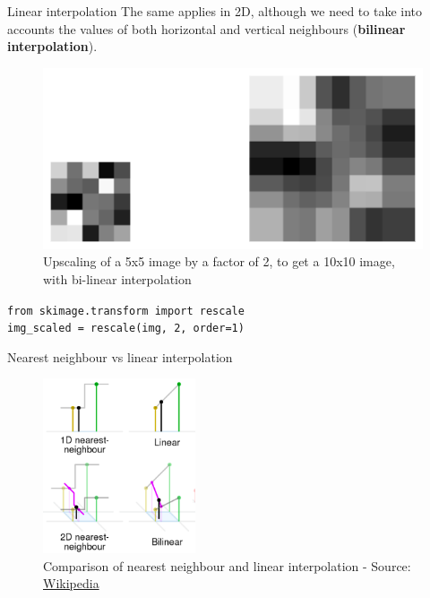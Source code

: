 \documentclass[9pt, aspectratio=169]{beamer}
\begin{document}
\begin{frame}
    {Linear interpolation}
    The same applies in 2D, although we need to take into accounts the values of both horizontal and vertical neighbours (\textbf{bilinear interpolation}).
    \begin{figure}
        \centering
        \includegraphics[width=.65\textwidth]{upscaling_lin_interpolation.png}
        \caption{Upscaling of a 5x5 image by a factor of 2, to get a 10x10 image, with bi-linear interpolation}
    \end{figure}

    \begin{codebox}
        \texttt{from skimage.transform import rescale\\
            img\_scaled = rescale(img, 2, order=1)}
    \end{codebox}
\end{frame}

\begin{frame}
    {Nearest neighbour vs linear interpolation}
    \begin{figure}

        \centering
        \includegraphics[width=0.4\textwidth]{interpolation schematics.png}
        \caption{Comparison of nearest neighbour and linear interpolation - Source: \href{https://en.wikipedia.org/wiki/Nearest-neighbor_interpolation}{Wikipedia}}
    \end{figure}
\end{frame}
\end{document}

